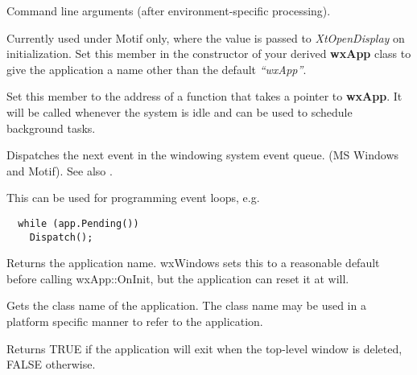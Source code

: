 

Command line arguments (after environment-specific processing).



Currently used under Motif only, where the value is passed to {\it
XtOpenDisplay} on initialization. Set this member in the constructor of
your derived {\bf wxApp} class to give the application a name other than
the default {\it ``wxApp''}.



Set this member to the address of a function that takes a pointer to {\bf wxApp}.
It will be called whenever the system is idle and can be used to schedule
background tasks.

\label{dispatch}


Dispatches the next event in the windowing system event queue.
(MS Windows and Motif). See also .

This can be used for programming event loops, e.g.

\begin{verbatim}
  while (app.Pending())
    Dispatch();
\end{verbatim}

\label{wxappgetappname}


Returns the application name. wxWindows sets this to a reasonable default before
calling wxApp::OnInit, but the application can reset it at will.

\label{wxappgetclassname}


Gets the class name of the application. The class name may be used in a platform specific
manner to refer to the application.

\label{wxappgetexitondelete}


Returns TRUE if the application will exit when the top-level window is deleted, FALSE
otherwise.

